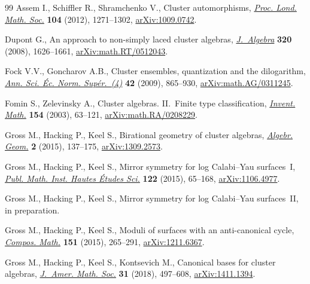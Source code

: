 \documentclass[11pt]{article}
\numberwithin{equation}{section}
\numberwithin{figure}{section}
\numberwithin{table}{section}
\theoremstyle{definition}
\begin{document}
\begin{thebibliography}{99}
Assem I., Schiffler R., Shramchenko V., Cluster automorphisms, \href{https://doi.org/10.1112/plms/pdr049}{\textit{Proc.
 Lond. Math. Soc.}} \textbf{104} (2012), 1271--1302, \href{https://arxiv.org/abs/1009.0742}{arXiv:1009.0742}.

Dupont G., An approach to non-simply laced cluster algebras,
 \href{https://doi.org/10.1016/j.jalgebra.2008.03.018}{\textit{J.~Algebra}} \textbf{320} (2008), 1626--1661,
 \href{https://arxiv.org/abs/math.RT/0512043}{arXiv:math.RT/0512043}.

Fock V.V., Goncharov A.B., Cluster ensembles, quantization and the dilogarithm,
 \href{https://doi.org/10.24033/asens.2112}{\textit{Ann. Sci. \'{E}c. Norm. Sup\'{e}r.~(4)}} \textbf{42} (2009), 865--930,
 \href{https://arxiv.org/abs/math.AG/0311245}{arXiv:math.AG/0311245}.

Fomin S., Zelevinsky A., Cluster algebras. {II}.~{F}inite type classification,
 \href{https://doi.org/10.1007/s00222-003-0302-y}{\textit{Invent. Math.}} \textbf{154} (2003), 63--121,
 \href{https://arxiv.org/abs/math.RA/0208229}{arXiv:math.RA/0208229}.

Gross M., Hacking P., Keel S., Birational geometry of cluster algebras,
 \href{https://doi.org/10.14231/AG-2015-007}{\textit{Algebr. Geom.}} \textbf{2} (2015), 137--175, \href{https://arxiv.org/abs/1309.2573}{arXiv:1309.2573}.

Gross M., Hacking P., Keel S., Mirror symmetry for log {C}alabi--{Y}au
 surfaces~{I}, \href{https://doi.org/10.1007/s10240-015-0073-1}{\textit{Publ. Math. Inst. Hautes \'{E}tudes Sci.}} \textbf{122}
 (2015), 65--168, \href{https://arxiv.org/abs/1106.4977}{arXiv:1106.4977}.

Gross M., Hacking P., Keel S., Mirror symmetry for log {C}alabi--{Y}au
 surfaces~{II}, {i}n preparation.

Gross M., Hacking P., Keel S., Moduli of surfaces with an anti-canonical cycle,
 \href{https://doi.org/10.1112/S0010437X14007611}{\textit{Compos. Math.}} \textbf{151} (2015), 265--291, \href{https://arxiv.org/abs/1211.6367}{arXiv:1211.6367}.

Gross M., Hacking P., Keel S., Kontsevich M., Canonical bases for cluster
 algebras, \href{https://doi.org/10.1090/jams/890}{\textit{J.~Amer. Math. Soc.}} \textbf{31} (2018), 497--608,
 \href{https://arxiv.org/abs/1411.1394}{arXiv:1411.1394}.


\end{thebibliography}
\end{document}
